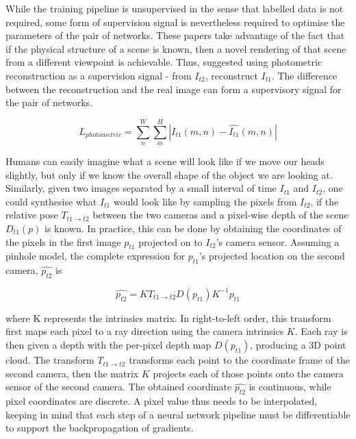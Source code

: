 \documentclass[openany]{book}
\begin{document}
While the training pipeline is unsupervised in the sense that labelled data is not required, some form of supervision signal is nevertheless required to optimise the parameters of the pair of networks. These papers take advantage of the fact that if the physical structure of a scene is known, then a novel rendering of that scene from a different viewpoint is achievable. Thus, \cite{garg2016unsupervised} suggested using photometric reconstruction as a supervision signal - from $I_{t2}$, reconstruct $I_{t1}$. The difference between the reconstruction and the real image can form a supervisory signal for the pair of networks. 


\begin{equation}
    L_{photometric} = \sum_n^W \sum_m^H |I_{t1}(m,n) - \hat{I_{t1}}(m,n)|
    \label{photometricloss}
\end{equation}


Humans can easily imagine what a scene will look like if we move our heads slightly, but only if we know the overall shape of the object we are looking at. Similarly, given two images separated by a small interval of time $I_{t1}$ and $I_{t2}$, one could synthesise what $I_{t1}$ would look like by sampling the pixels from $I_{t2}$, if the relative pose $T_{t1\rightarrow t2}$ between the two cameras and a pixel-wise depth of the scene $D_{t1}(p)$ is known. In practice, this can be done by obtaining the coordinates of the pixels in the first image $p_{t1}$ projected on to $I_{t2}$'s camera sensor. Assuming a pinhole model, the complete expression for $p_{t1}$'s projected location on the second camera, $\hat{p_{t2}}$ is 

\begin{equation}
\hat{p_{t2}} = KT_{t1\rightarrow t2} D(p_{t1}) K^{-1} p_{t1}
\end{equation}

where K represents the intrinsics matrix. In right-to-left order, this transform first maps each pixel to a ray direction using the camera intrinsics $K$. Each ray is then given a depth with the per-pixel depth map $D(p_{t1})$, producing a 3D point cloud. The transform $T_{t1 \rightarrow t2}$ transforms each point to the coordinate frame of the second camera, then the matrix $K$ projects each of those points onto the camera sensor of the second camera. The obtained coordinate $\hat{p_{t2}}$ is continuous, while pixel coordinates are discrete. A pixel value thus needs to be interpolated, keeping in mind that each step of a neural network pipeline must be differentiable to support the backpropagation of gradients. 
\end{document}

